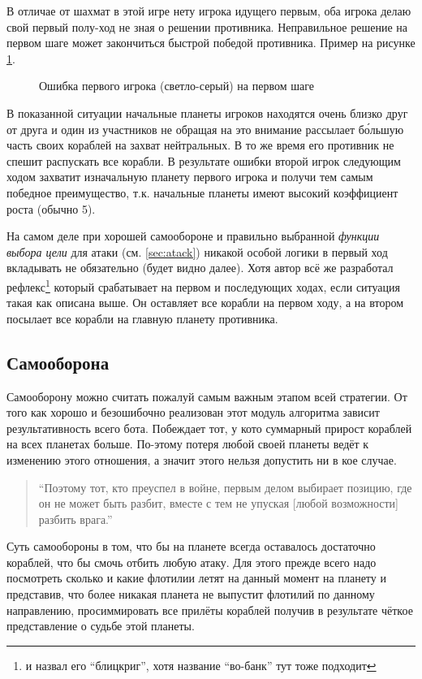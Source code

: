 \documentclass[12pt]{report}
\begin{document}
В отличае от шахмат в этой игре нету игрока идущего первым, оба игрока делаю свой первый полу-ход не зная о решении противника. Неправильное решение на первом шаге может закончиться быстрой победой противника. Пример на рисунке \ref{fig:first_move1}.

\begin{figure}[h]
	\centering
	
	\caption{Ошибка первого игрока (светло-серый) на первом шаге}
	\label{fig:first_move1}
\end{figure}
В показанной ситуации начальные планеты игроков находятся очень близко друг от друга и один из участников не обращая на это внимание рассылает б\'{о}льшую часть своих кораблей на захват нейтральных. В то же время его противник не спешит распускать все корабли. В результате ошибки второй игрок следующим ходом захватит изначальную планету первого игрока и получи тем самым победное преимущество, т.к. начальные планеты имеют высокий коэффициент роста (обычно 5).

На самом деле при хорошей самообороне и правильно выбранной \emph{функции выбора цели} для атаки (см. \ref{sec:atack}) никакой особой логики в первый ход вкладывать не обязательно (будет видно далее). Хотя автор всё же разработал рефлекс\footnote{и назвал его ``блицкриг'', хотя название ``во-банк'' тут тоже подходит} который срабатывает на первом и последующих ходах, если ситуация такая как описана выше. Он оставляет все корабли на первом ходу, а на втором посылает все корабли на главную планету противника.

\subsection{Самооборона}
\label{sec:selfdefense}
Самооборону можно считать пожалуй самым важным этапом всей стратегии. От того как хорошо и безошибочно реализован этот модуль алгоритма зависит результативность всего бота. Побеждает тот, у кото суммарный прирост кораблей на всех планетах больше. По-этому потеря любой своей планеты ведёт к изменению этого отношения, а значит этого нельзя допустить ни в кое случае.
\begin{quote}
``Поэтому тот, кто преуспел в войне, первым делом выбирает позицию, где он не может быть разбит, вместе с тем не упуская [любой возможности] разбить врага.'' \\
\citep{tzu1971art}
\end{quote}

Суть самообороны в том, что бы на планете всегда оставалось достаточно кораблей, что бы смочь отбить любую атаку. Для этого прежде всего надо посмотреть сколько и какие флотилии летят на данный момент на планету и представив, что более никакая планета не выпустит флотилий по данному направлению, просиммировать все прилёты кораблей получив в результате чёткое представление о судьбе этой планеты. 
\end{document}
